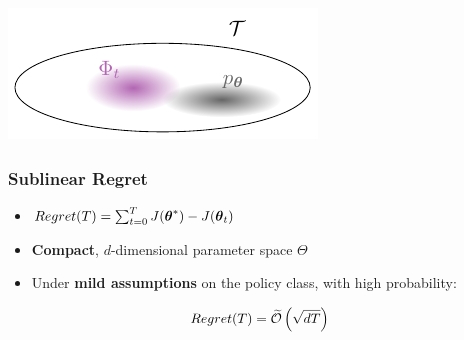 \documentclass[aspectratio=169, table]{beamer}
\newcommand{\enb}[1]{\textcolor{poliblue1}{\textbf{#1}}}
\begin{document}
\begin{frame}
\begin{overlayarea}{\textwidth}{.25\textheight}
{	\includegraphics[]{animation/spaces9.pdf}
}
\end{overlayarea}
\end{frame}

\begin{frame} 
\frametitle{Sublinear Regret}
\begin{overlayarea}{\textwidth}{.4\textheight}
\begin{itemize}
	\setlength{\itemsep}{20pt}
	\item<1-> $\mathop{Regret}(T) = \sum_{t=0}^T J(\boldsymbol{\theta}^*) - J(\boldsymbol{\theta}_t)$
	\vfill
	\item<2-> \enb{Compact}, $d$-dimensional parameter space $\Theta$
	\vfill
	\item<3-> Under \enb{mild assumptions} on the policy class, with high probability:
\end{itemize}
\end{overlayarea}
\LARGE
\begin{align*}
\mathop{Regret}(T) = \widetilde{\mathcal{O}}\left(\sqrt{dT}\right)
\end{align*}
\end{frame}
\end{document}
